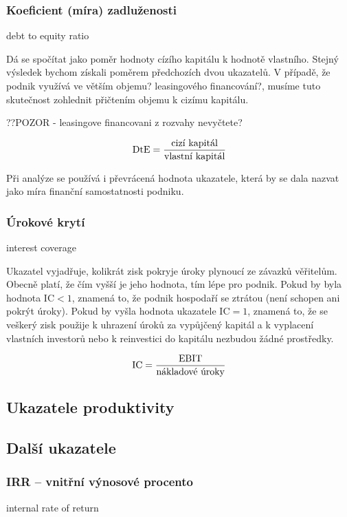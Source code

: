 \subsubsection{Koeficient (míra) zadluženosti}
debt to equity ratio

Dá se spočítat jako poměr hodnoty cízího kapitálu k hodnotě vlastního. Stejný výsledek bychom získali poměrem předchozích dvou ukazatelů. V případě, že podnik využívá ve větším objemu? leasingového financování?, musíme tuto skutečnost zohlednit přičtením objemu k cizímu kapitálu. 

??POZOR - leasingove financovani z rozvahy nevyčtete?

$$\text{DtE} = \dfrac{\text{cizí kapitál}}{\text{vlastní kapitál}}$$

Při analýze se používá i převrácená hodnota ukazatele, která by se dala nazvat jako míra finanční samostatnosti podniku.

\subsubsection{Úrokové krytí}
interest coverage

Ukazatel vyjadřuje, kolikrát zisk pokryje úroky plynoucí ze závazků věřitelům. Obecně platí, že čím vyšší je jeho hodnota, tím lépe pro podnik. Pokud by byla hodnota IC$<1$, znamená to, že podnik hospodaří se ztrátou (není schopen ani pokrýt úroky). Pokud by vyšla hodnota ukazatele IC$=1$, znamená to, že se veškerý zisk použije k uhrazení úroků za vypůjčený kapitál a k vyplacení vlastních investorů nebo k reinvestici do kapitálu nezbudou žádné prostředky.

$$\text{IC} = \dfrac{\text{EBIT}}{\text{nákladové úroky}}$$







\subsection{Ukazatele produktivity}

\subsection{Další ukazatele}

\subsubsection{IRR -- vnitřní výnosové procento}
internal rate of return

